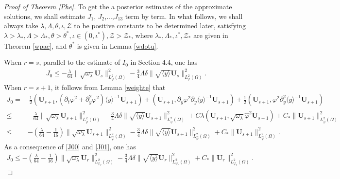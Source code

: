 \documentclass[10pt,a4paper]{amsart}
\newcommand\y{{{\langle y \rangle}}}
\begin{document}
\begin{proof}[Proof of Theorem \ref{Phe}]
To get the a posterior estimates of the approximate solutions, we shall estimate $J_{1}$, $J_{2}$,...,$J_{13}$ term by term.
In what follows, we shall always take $\lambda, \Lambda, \theta, \iota, \mathcal{Z}$ to be positive constants to be determined later, satisfying $\lambda>\lambda_{*}, \Lambda>\Lambda_{*}, \theta>\theta^{*}, \iota\in(0,\iota^{*}), \mathcal{Z}>\mathcal{Z}_{*}$, where $\lambda_{*}, \Lambda_{*},\iota^{*}, \mathcal{Z}_{*}$ are given in Theorem \ref{wpae}, and $\theta^{*}$ is given in Lemma \ref{wdotu}.

When $r=s$, parallel to the estimate of $I_{0}$ in Section 4.4, one has
\begin{align}\label{J00}
J_{0}\leq -\frac{\lambda}{64}\|\sqrt{\omega_{\lambda}}\mathbf{U}_{s}\|_{L_{\varphi}^{2}(\Omega)}^{2}
          -\frac{3}{4}\Lambda\delta\|\sqrt{\y}\mathbf{U}_{s}\|_{L_{\varphi}^{2}(\Omega)}^{2}.
\end{align}
When $r=s+1$, it follows from Lemma \ref{weighte} that
\begin{align}\label{J01}
J_{0}
=&~\frac{1}{2}(\mathbf{U}_{s+1},(\partial_{t}\varphi^{2}+\partial_{y}^{2}\varphi^{2})\y^{-1}\mathbf{U}_{s+1})
  +(\mathbf{U}_{s+1},\partial_{y}\varphi^{2}\partial_{y}\y^{-1}\mathbf{U}_{s+1})
  +\frac{1}{2}(\mathbf{U}_{s+1},\varphi^{2}\partial_{y}^{2}\y^{-1}\mathbf{U}_{s+1})\\
\leq&-\frac{\lambda}{64}\|\sqrt{\omega_{\lambda}}\mathbf{U}_{s+1}\|_{L_{\hat{\varphi}}^{2}(\Omega)}^{2}
     -\frac{3}{4}\Lambda\delta\|\sqrt{\y}\mathbf{U}_{s+1}\|_{L_{\hat{\varphi}}^{2}(\Omega)}^{2}
     +C\lambda(\mathbf{U}_{s+1},\sqrt{\omega_{\lambda}}\hat{\varphi}^{2}\mathbf{U}_{s+1})
     +C_{*}\|\mathbf{U}_{s+1}\|_{L_{\hat{\varphi}}^{2}(\Omega)}^{2}\nonumber\\
\leq&-\left(\frac{\lambda}{64}-\frac{1}{16}\right)\|\sqrt{\omega_{\lambda}}\mathbf{U}_{s+1}\|_{L_{\hat{\varphi}}^{2}(\Omega)}^{2}
     -\frac{3}{4}\Lambda\delta\|\sqrt{\y}\mathbf{U}_{s+1}\|_{L_{\hat{\varphi}}^{2}(\Omega)}^{2}
     +C_{*}\|\mathbf{U}_{s+1}\|_{L_{\hat{\varphi}}^{2}(\Omega)}^{2}.\nonumber
\end{align}
As a consequence of \eqref{J00} and \eqref{J01}, one has
\begin{align*}
J_{0}
\leq -\left(\frac{\lambda}{64}-\frac{1}{16}\right)\|\sqrt{\omega_{\lambda}}\mathbf{U}_{r}\|_{L_{\varphi_{r}}^{2}(\Omega)}^{2}
     -\frac{3}{4}\Lambda\delta\|\sqrt{\y}\mathbf{U}_{r}\|_{L_{\varphi_{r}}^{2}(\Omega)}^{2}
     +C_{*}\|\mathbf{U}_{r}\|_{L_{\varphi_{r}}^{2}(\Omega)}^{2}.
\end{align*}




\end{proof}
\end{document}
